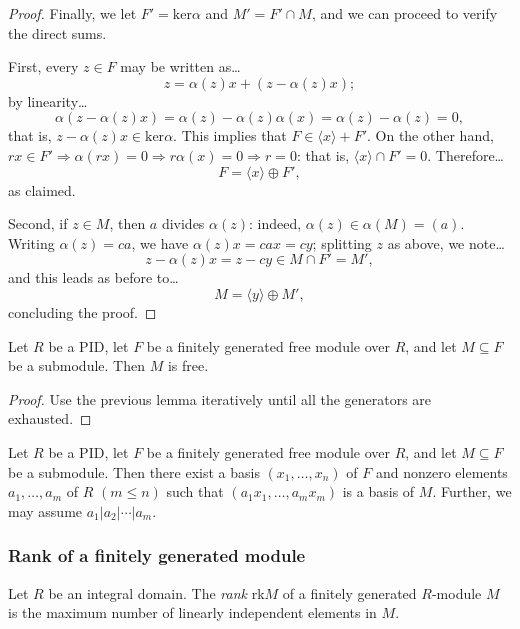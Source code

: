 \begin{proof}
Finally, we let $F' = \textrm{ker} \alpha$ and $M' = F' \cap M$, and we can proceed to verify the direct sums.

First, every $z \in F$ may be written as\dots
$$z = \alpha(z)x + (z - \alpha(z)x);$$
by linearity\dots
$$\alpha(z - \alpha(z)x) = \alpha(z) - \alpha(z)\alpha(x) = \alpha(z) - \alpha(z) = 0,$$
that is, $z - \alpha(z)x \in \textrm{ker}\alpha$. This implies that $F \in \langle x \rangle + F'$. On the other hand, $rx \in F' \Rightarrow \alpha(rx) = 0 \Rightarrow r\alpha(x) = 0 \Rightarrow r = 0$:
that is, $\langle x \rangle \cap F' = 0.$ Therefore\dots
$$F = \langle x \rangle \oplus F',$$
as claimed.

Second, if $z \in M$, then $a$ divides $\alpha(z)$: indeed, $\alpha(z) \in \alpha(M) = (a)$. Writing $\alpha(z) = ca$, we have $\alpha(z)x = cax = cy$; splitting
$z$ as above, we note\dots
$$z - \alpha(z)x = z - cy \in M \cap F' = M',$$
and this leads as before to\dots
$$M = \langle y \rangle \oplus M',$$
concluding the proof.
\end{proof}

\begin{proposition}
Let $R$ be a PID, let $F$ be a finitely generated free module over $R$, and let $M \subseteq F$ be a submodule.
Then $M$ is free.
\end{proposition}

\begin{proof}
Use the previous lemma iteratively until all the generators are exhausted.
\end{proof}

\begin{corollary}
Let $R$ be a PID, let $F$ be a finitely generated free module over $R$, and let $M \subseteq F$ be a submodule. Then there exist a basis $(x_1, \dots, x_n)$ of $F$ and
nonzero elements $a_1, \dots, a_m$ of $R$ $(m \leq n)$ such that $(a_1x_1, \dots, a_mx_m)$ is a basis of $M$. Further, we may assume $a_1 | a_2 | \cdots | a_m$.
\end{corollary}

\subsubsection{Rank of a finitely generated module}
Let $R$ be an integral domain. The \emph{rank} rk$M$ of a finitely generated $R$-module $M$ is the maximum number of linearly independent elements in $M$.

